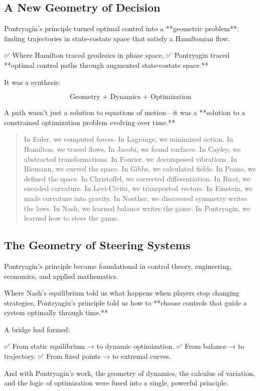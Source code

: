 \bigskip

\subsection*{A New Geometry of Decision}

Pontryagin’s principle turned optimal control into a **geometric problem**:  
finding trajectories in state-costate space that satisfy a Hamiltonian flow.

✅ Where Hamilton traced geodesics in phase space,  
✅ Pontryagin traced **optimal control paths through augmented state-costate space.**

It was a synthesis:

\[
\boxed{\text{Geometry + Dynamics + Optimization}}
\]

A path wasn’t just a solution to equations of motion—it was a **solution to a constrained optimization problem evolving over time.**

\bigskip

\begin{quote}
In Euler, we computed forces.  
In Lagrange, we minimized action.  
In Hamilton, we traced flows.  
In Jacobi, we found surfaces.  
In Cayley, we abstracted transformations.  
In Fourier, we decomposed vibrations.  
In Riemann, we curved the space.  
In Gibbs, we calculated fields.  
In Peano, we defined the space.  
In Christoffel, we corrected differentiation.  
In Ricci, we encoded curvature.  
In Levi-Civita, we transported vectors.  
In Einstein, we made curvature into gravity.  
In Noether, we discovered symmetry writes the laws.  
In Nash, we learned balance writes the game.  
In Pontryagin, we learned how to steer the game.
\end{quote}

\subsection*{The Geometry of Steering Systems}

Pontryagin’s principle became foundational in control theory, engineering, economics, and applied mathematics.

Where Nash’s equilibrium told us what happens when players stop changing strategies,  
Pontryagin’s principle told us how to **choose controls that guide a system optimally through time.**

A bridge had formed:

✅ From static equilibrium → to dynamic optimization.  
✅ From balance → to trajectory.  
✅ From fixed points → to extremal curves.

And with Pontryagin’s work, the geometry of dynamics, the calculus of variation, and the logic of optimization were fused into a single, powerful principle.


